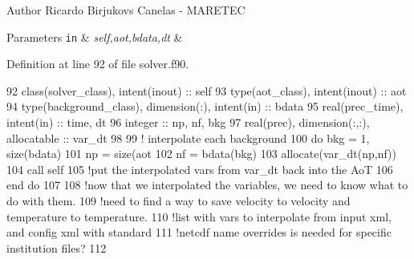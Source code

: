 \begin{DoxyAuthor}{Author}
Ricardo Birjukovs Canelas -\/ M\+A\+R\+E\+T\+EC 
\end{DoxyAuthor}

\begin{DoxyParams}[1]{Parameters}
\mbox{\tt in}  & {\em self,aot,bdata,dt} & \\
\hline
\end{DoxyParams}


Definition at line 92 of file solver.\+f90.


\begin{DoxyCode}
92     \textcolor{keywordtype}{class}(solver\_class), \textcolor{keywordtype}{intent(inout)} :: self
93     \textcolor{keywordtype}{type}(aot\_class), \textcolor{keywordtype}{intent(inout)} :: aot
94     \textcolor{keywordtype}{type}(background\_class), \textcolor{keywordtype}{dimension(:)}, \textcolor{keywordtype}{intent(in)} :: bdata
95     \textcolor{keywordtype}{real(prec\_time)}, \textcolor{keywordtype}{intent(in)} :: time, dt
96     \textcolor{keywordtype}{integer} :: np, nf, bkg
97     \textcolor{keywordtype}{real(prec)}, \textcolor{keywordtype}{dimension(:,:)}, \textcolor{keywordtype}{allocatable} :: var\_dt
98 
99     \textcolor{comment}{! interpolate each background}
100     \textcolor{keywordflow}{do} bkg = 1, \textcolor{keyword}{size}(bdata)
101         np = \textcolor{keyword}{size}(aot%
102         nf = bdata(bkg)%
103         \textcolor{keyword}{allocate}(var\_dt(np,nf))
104         \textcolor{keyword}{call }self%
105         \textcolor{comment}{!put the interpolated vars from var\_dt back into the AoT}
106 \textcolor{keywordflow}{    end do}
107 
108     \textcolor{comment}{!now that we interpolated the variables, we need to know what to do with them.}
109     \textcolor{comment}{!need to find a way to save velocity to velocity and temperature to temperature.}
110     \textcolor{comment}{!list with vars to interpolate from input xml, and config xml with standard}
111     \textcolor{comment}{!netcdf name overrides is needed for specific institution files?}
112 
\end{DoxyCode}
